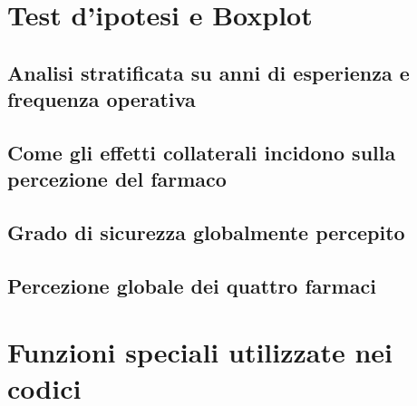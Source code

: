 \newpage

\section{Test d'ipotesi e Boxplot}

    \subsection*{Analisi stratificata su anni di esperienza e frequenza operativa}
    \label{code:quality-strati}
    
    \newpage

    \subsection*{Come gli effetti collaterali incidono sulla percezione del farmaco}
    \label{code:adverse-effects-perception}
    
    \newpage

    \subsection*{Grado di sicurezza globalmente percepito}
    \label{code:safety}
    
    \newpage

    \subsection*{Percezione globale dei quattro farmaci}
    \label{code:quality-global}
    
    \newpage

\newpage

\section{Funzioni speciali utilizzate nei codici}
\label{code:subroutines}

    
    \bigskip

    
    \bigskip

    
    \bigskip
